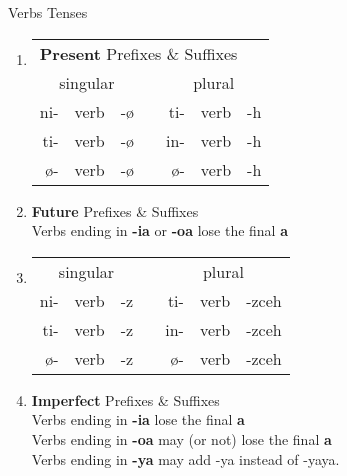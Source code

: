 \documentclass[12pt]{beamer}
\newcommand{\nah}[1]{\textcolor{nahgrn}{#1}}
\newcommand{\trs}[1]{\textcolor{nahblu}{#1}}
\begin{document}
\begin{frame}
\begin{columns}[t]
		\begin{column}{.26\linewidth}
			\begin{block}{Verbs Tenses}
				\begin{enumerate}
					\item \begin{tabular}[t]{rllcrll}
						\multicolumn{7}{l}{\textbf{Present} \nah{Prefixes} \& \trs{Suffixes}}              \\
						\multicolumn{3}{c}{singular}    & \vline & \multicolumn{3}{c}{plural}     \\
						\cline{1-7}
						\nah{ni-}   & verb & \trs{-ø}   & \vline & \nah{ti-}   & verb & \trs{-h}  \\
						\nah{ti-}   & verb & \trs{-ø}   & \vline & \nah{in-}   & verb & \trs{-h}  \\
						\nah{ø-}    & verb & \trs{-ø}   & \vline & \nah{ø-}    & verb & \trs{-h}  \\
					\end{tabular}%
					\item \textbf{Future} \nah{Prefixes} \& \trs{Suffixes}\\
					Verbs ending in \textbf{-ia} or \textbf{-oa} lose the final \textbf{a}\\
					\item \begin{tabular}[t]{rllcrll}
						\multicolumn{3}{c}{singular}    & \vline & \multicolumn{3}{c}{plural}        \\
						\cline{1-7}
						\nah{ni-}   & verb & \trs{-z}   & \vline & \nah{ti-}   & verb & \trs{-zceh}  \\
						\nah{ti-}   & verb & \trs{-z}   & \vline & \nah{in-}   & verb & \trs{-zceh}  \\
						\nah{ø-}    & verb & \trs{-z}   & \vline & \nah{ø-}    & verb & \trs{-zceh}  \\
					\end{tabular}%
					\item \textbf{Imperfect} \nah{Prefixes} \& \trs{Suffixes}\\
					Verbs ending in \textbf{-ia} lose the final \textbf{a}\\
					Verbs ending in \textbf{-oa} may (or not) lose the final \textbf{a}\\
					Verbs ending in \textbf{-ya} may add \trs{-ya} instead of \trs{-yaya}.\\

\end{enumerate}
\end{block}
\end{column}
\end{columns}
\end{frame}
\end{document}
